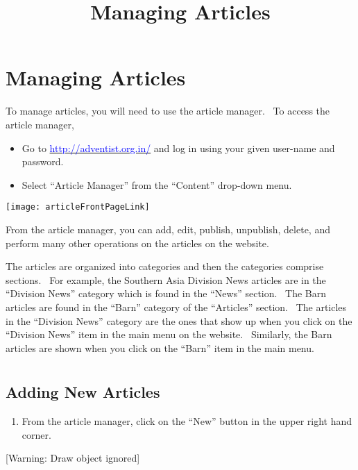 \documentclass[12pt,twoside]{article}
\title{Managing Articles}
\newcommand\textstyleInternetlink[1]{\textcolor{blue}{#1}}
\newcommand\liststyleWWviiiNumii{%
\renewcommand\labelitemi{[F0B7?]}
\renewcommand\labelitemii{o}
\renewcommand\labelitemiii{[F0A7?]}
\renewcommand\labelitemiv{[F0B7?]}
}
\newcommand\liststyleLi{%
\renewcommand\theenumi{\arabic{enumi}}
\renewcommand\theenumii{\arabic{enumii}}
\renewcommand\theenumiii{\arabic{enumiii}}
\renewcommand\theenumiv{\arabic{enumiv}}
\renewcommand\labelenumi{1.\theenumi)}
\renewcommand\labelenumii{\theenumii.}
\renewcommand\labelenumiii{\theenumiii.}
\renewcommand\labelenumiv{\theenumiv.}
}
\begin{document}
\clearpage\pagestyle{Standard}
\section{Managing Articles}

\bigskip

{
To manage articles, you will need to use the article manager. \ To
access the article manager, }

\liststyleWWviiiNumii
\begin{itemize}
\item {
Go to
\href{http://adventist.org.in/}{\textstyleInternetlink{http://adventist.org.in/}}
and log in using your given user-name and password.}
\item {
Select ``Article Manager'' from the ``Content'' drop{}-down menu. }
\end{itemize}
{\centering{}
 \texttt{[image: articleFrontPageLink]}
\par}

{
From the article manager, you can add, edit, publish, unpublish, delete,
and perform many other operations on the articles on the website.}

{
The articles are organized into categories and then the categories
comprise sections. \ For example, the Southern Asia Division News
articles are in the ``Division News'' category which is found in the
``News'' section. \ The Barn articles are found in the ``Barn''
category of the ``Articles'' section. \ The articles in the ``Division
News'' category are the ones that show up when you click on the
``Division News'' item in the main menu on the website. \ Similarly,
the Barn articles are shown when you click on the ``Barn'' item in the
main menu.}

\clearpage\section{}
\subsection[Adding New Articles]{\rmfamily\upshape Adding New Articles}

\bigskip

\liststyleLi
\begin{enumerate}
\item {
From the article manager, click on the ``New'' button in the upper right
hand corner. }
\end{enumerate}
{\centering{}
[Warning: Draw object ignored]
\par}
\end{document}
